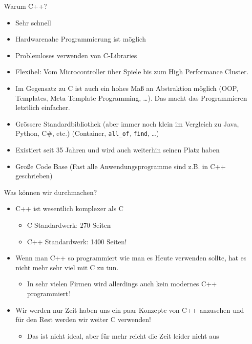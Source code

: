 \documentclass[presentation]{beamer}
\begin{document}
\begin{frame}[label={sec:org7d290d8},fragile]{Warum C++?}
 \begin{itemize}
\item Sehr \alert{schnell}
\item \alert{Hardwarenahe Programmierung} ist möglich
\item Problemloses verwenden von \alert{C-Libraries}
\item \alert{Flexibel}: Vom Microcontroller über Spiele bis zum High Performance
Cluster.
\item Im Gegensatz zu C ist auch ein \alert{hohes Maß an Abstraktion} möglich
(OOP, Templates, Meta Template Programming, \ldots{}). Das macht das
Programmieren letztlich \alert{einfacher}.
\item \alert{Grössere Standardbibliothek} (aber immer noch klein im Vergleich zu
Java, Python, C\#, etc.) (Container, {\color{solarizedYellow}\verb!all_of!}, {\color{solarizedYellow}\verb!find!}, \ldots{})
\item Existiert seit \alert{35 Jahren} und wird auch weiterhin seinen Platz haben
\item \alert{Große Code Base} (Fast alle Anwendungsprogramme sind z.B. in C++
geschrieben)
\end{itemize}
\end{frame}
\begin{frame}[label={sec:org32a2156}]{Was können wir durchmachen?}
\begin{itemize}
\item C++ ist wesentlich komplexer als C
\begin{itemize}
\item C Standardwerk: 270 Seiten
\item C++ Standardwerk: \alert{1400 Seiten!}
\end{itemize}
\item Wenn man C++ so programmiert wie man es Heute verwenden sollte, hat
es nicht mehr sehr viel mit C zu tun.
\begin{itemize}
\item In sehr vielen Firmen wird allerdings auch kein modernes C++
programmiert!
\end{itemize}
\item Wir werden nur Zeit haben uns ein paar Konzepte von C++ anzusehen
und für den Rest werden wir weiter C verwenden!
\begin{itemize}
\item Das ist nicht ideal, aber für mehr reicht die Zeit leider nicht
aus
\end{itemize}
\end{itemize}
\end{frame}
\end{document}
